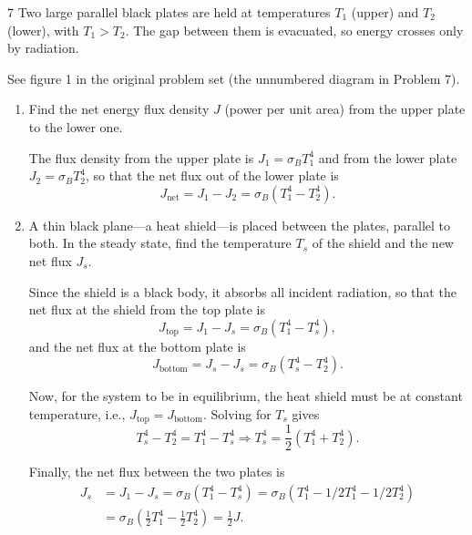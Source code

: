 \documentclass[11pt]{article}
\begin{document}
\begin{problem}{7}
Two large parallel black plates are held at temperatures \( T_1 \) (upper) and \( T_2 \) (lower), with \( T_1 > T_2 \).
The gap between them is evacuated, so energy crosses only by radiation.

See figure 1 in the original problem set (the unnumbered diagram in Problem 7).
\begin{enumerate}[label=(\alph*)]
  \item Find the net energy flux density \( J \) (power per unit area) from the upper plate to the lower one.
        \begin{answer}
          The flux density from the upper plate is \( J_{1} = \sigma_BT_{1}^4 \) and from the lower plate \( J_2 = \sigma_BT_2^4 \), so that the net flux out of the lower plate is
          \begin{equation}
          \label{eq:15}
          J_{\text{net}} = J_1 - J_{2} = \sigma_B(T_1^4 - T_2^4).
        \end{equation}
        \end{answer}

  \item A thin black plane---a heat shield---is placed between the plates, parallel to both.
  In the steady state, find the temperature \( T_s \) of the shield and the new net flux \( J_s \).
        \begin{answer}
          Since the shield is a black body, it absorbs all incident radiation, so that the net flux at the shield from the top plate is
          \begin{equation}
          \label{eq:16}
          J_{\text{top}} = J_1 - J_s = \sigma_B(T_1^4 - T_s^4),
        \end{equation}
        and the net flux at the bottom plate is
        \begin{equation}
        \label{eq:17}
        J_{\text{bottom}} = J_s - J_s = \sigma_B(T_s^4 - T_2^4).
      \end{equation}

      Now, for the system to be in equilibrium, the heat shield must be at constant temperature, i.e., \( J_{\text{top}} = J_{\text{bottom}} \).
      Solving for \( T_s \) gives
      \begin{equation}
      \label{eq:18}
      T_s^4 - T_2^4 = T_1^4 - T_s^4 \Rightarrow T_s^{4} = \frac{1}{2}(T_1^{4} + T_2^4).
      \end{equation}

      Finally, the net flux between the two plates is
      \begin{equation}
      \label{eq:19}
      \begin{aligned}
        J_s &= J_1 - J_s = \sigma_B(T_1^4 - T_s^4) = \sigma_B(T_1^4 - 1/2 T_1^4 - 1/2 T_2^{4}) \\
        &= \sigma_B(\frac{1}{2} T_1^4 - \frac{1}{2} T_2^{4}) = \frac{1}{2} J.
      \end{aligned}
      \end{equation}
        \end{answer}


\end{enumerate}
\end{problem}
\end{document}
